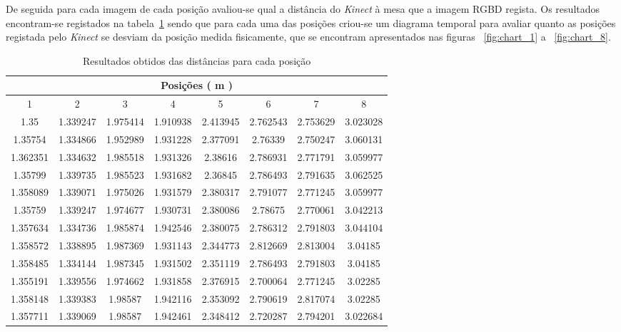 De seguida para cada imagem de cada posição avaliou-se qual a distância do \emph{Kinect} à mesa que a imagem RGBD regista. Os resultados encontram-se registados na tabela~\ref{res:exp_res_obtidos} sendo que para cada uma das posições criou-se um diagrama temporal para avaliar quanto as posições registada pelo \emph{Kinect} se desviam da posição medida fisicamente, que se encontram apresentados nas figuras ~\ref{fig:chart_1} a ~\ref{fig:chart_8}.


\begin{table}[!htb]
\begin{center}
\begin{tabular} { c c c c c c c c }

\hline
\multicolumn{8}{c}{ Posições ( m ) }\\
\hline
 1 & 2 & 3 & 4 & 5 & 6 & 7 & 8 \\
\hline
1.35 & 1.339247 & 1.975414 & 1.910938 & 2.413945 & 2.762543 & 2.753629 & 3.023028 \\
1.35754 & 1.334866 & 1.952989 & 1.931228 & 2.377091 & 2.76339 & 2.750247 & 3.060131 \\
1.362351 & 1.334632 & 1.985518 & 1.931326 & 2.38616 & 2.786931 & 2.771791 & 3.059977 \\
1.35799 & 1.339735 & 1.985523 & 1.931682 & 2.36845 & 2.786493 & 2.791635 & 3.062525 \\
1.358089 & 1.339071 & 1.975026 & 1.931579 & 2.380317 & 2.791077 & 2.771245 & 3.059977 \\
1.35759 & 1.339247 & 1.974677 & 1.930731 & 2.380086 & 2.78675 & 2.770061 & 3.042213 \\
1.357634 & 1.334736 & 1.985874 & 1.942546 & 2.380075 & 2.786312 & 2.791803 & 3.044104 \\
1.358572 & 1.338895 & 1.987369 & 1.931143 & 2.344773 & 2.812669 & 2.813004 & 3.04185 \\
1.358485 & 1.334144 & 1.987345 & 1.931502 & 2.351119 & 2.786493 & 2.791803 & 3.04185 \\
1.355191 & 1.339556 & 1.974662 & 1.931858 & 2.376915 & 2.700064 & 2.771245 & 3.02285 \\
1.358148 & 1.339383 & 1.98587 & 1.942116 & 2.353092 & 2.790619 & 2.817074 & 3.02285 \\
1.357711 & 1.339069 & 1.98587 & 1.942461 & 2.348412 & 2.720287 & 2.794201 & 3.022684 \\
\hline
\end{tabular}
	\caption{Resultados obtidos das distâncias para cada posição}
	\label{res:exp_res_obtidos}
\end{center}
\end{table}


